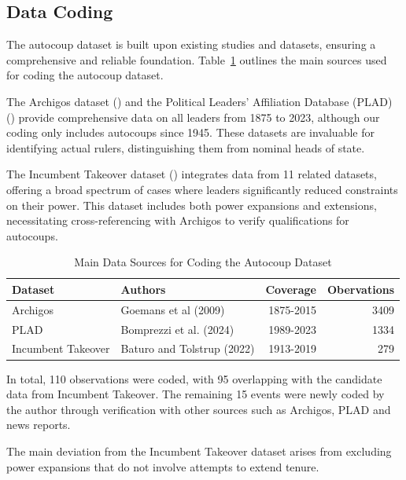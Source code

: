 \documentclass[
  12pt,
]{report}
\begin{document}
\subsection{Data Coding}\label{data-coding}

The autocoup dataset is built upon existing studies and datasets,
ensuring a comprehensive and reliable foundation. Table~\ref{tbl-source}
outlines the main sources used for coding the autocoup dataset.

The Archigos dataset () and the Political Leaders' Affiliation Database (PLAD)
() provide
comprehensive data on all leaders from 1875 to 2023, although our coding
only includes autocoups since 1945. These datasets are invaluable for
identifying actual rulers, distinguishing them from nominal heads of
state.

The Incumbent Takeover dataset () integrates data from 11 related datasets, offering a
broad spectrum of cases where leaders significantly reduced constraints
on their power. This dataset includes both power expansions and
extensions, necessitating cross-referencing with Archigos to verify
qualifications for autocoups.

\begin{longtable}[]{@{}llrr@{}}

\caption{\label{tbl-source}Main Data Sources for Coding the Autocoup
Dataset}

\tabularnewline

\toprule\noalign{}
Dataset & Authors & Coverage & Obervations \\
\midrule\noalign{}
\endhead
\bottomrule\noalign{}
\endlastfoot
Archigos & Goemans et al (2009) & 1875-2015 & 3409 \\
PLAD & Bomprezzi et al. (2024) & 1989-2023 & 1334 \\
Incumbent Takeover & Baturo and Tolstrup (2022) & 1913-2019 & 279 \\

\end{longtable}

In total, 110 observations were coded, with 95 overlapping with the
candidate data from Incumbent Takeover. The remaining 15 events were
newly coded by the author through verification with other sources such
as Archigos, PLAD and news reports.

The main deviation from the Incumbent Takeover dataset arises from
excluding power expansions that do not involve attempts to extend
tenure.
\end{document}
